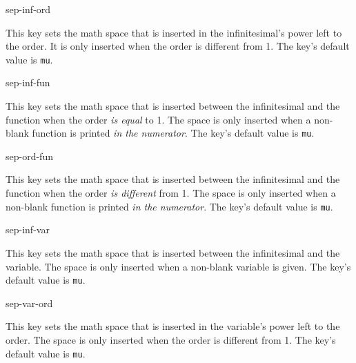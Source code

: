 \documentclass[final,british,10pt]{scrartcl}
\theoremstyle{remark}
\begin{document}
	\begin{option}{sep-inf-ord}
		\begin{values}[default = 0]
		\end{values}
		This key sets the math space that is inserted in the infinitesimal's power left to the order. It is only inserted when the order is different from \num{1}. The key's default value is  \texttt{mu}.
	\end{option}
	
	\begin{option}{sep-inf-fun}
		\begin{values}[default = 0]
		\end{values}
		This key sets the math space that is inserted between the infinitesimal and the function when the order \emph{is equal} to \num{1}. The space is only inserted when a non-blank function is printed \emph{in the numerator}. The key's default value is  \texttt{mu}.
	\end{option}
	
	\begin{option}{sep-ord-fun}
		\begin{values}[default = 0]
		\end{values}
		This key sets the math space that is inserted between the infinitesimal and the function when the order \emph{is different} from \num{1}. The space is only inserted when a non-blank function is printed \emph{in the numerator}. The key's default value is  \texttt{mu}.
	\end{option}
	
	\begin{option}{sep-inf-var}
		\begin{values}[default = 0]
		\end{values}
		This key sets the math space that is inserted between the infinitesimal and the variable. The space is only inserted when a non-blank variable is given. The key's default value is  \texttt{mu}.
	\end{option}
	
	\begin{option}{sep-var-ord}
		\begin{values}[default = 0]
		\end{values}
		This key sets the math space that is inserted in the variable's power left to the order. The space is only inserted when the order is different from \num{1}. The key's default value is  \texttt{mu}.
	\end{option}
	
\end{document}
